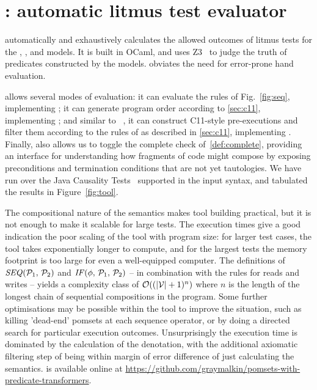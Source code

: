 \section{\PwTerTITLE: automatic litmus test evaluator}
\label{sec:tool}

\PwTer{} automatically and exhaustively calculates the allowed outcomes of litmus tests for the \PwT, \PwTpo, and \PwTc{} models. It is built in OCaml, and uses Z3~\cite{Z3Solver} to judge the truth of predicates constructed by the models. \PwTer{} obviates the need for error-prone hand evaluation.

\PwTer{} allows several modes of evaluation: it can evaluate the rules of Fig.~\ref{fig:seq}, implementing \PwT; it can generate program order according to \textsection\ref{sec:c11}, implementing \PwTpo; and similar to \MRD~\cite{DBLP:conf/esop/PaviottiCPWOB20}, it can construct C11-style pre-executions and filter them according to the rules of \rcXI{} as described in \textsection\ref{sec:c11}, implementing \PwTc{}.
Finally, \PwTer{} also allows us to toggle the complete check of~\ref{def:complete}, providing an interface for understanding how fragments of code might compose by exposing preconditions and termination conditions that are not yet tautologies.
We have run \PwTer{} over the Java Causality Tests~\cite{PughWebsite} supported in the input syntax, and tabulated the results in Figure~\ref{fig:tool}.

The compositional nature of the semantics makes tool building practical, but it is not enough to make it scalable for large tests.
The execution times give a good indication the poor scaling of the tool with program size: for larger test cases, the tool takes exponentially longer to compute, and for the largest tests the memory footprint is too large for even a well-equipped computer.
The definitions of $\sSEMI{\aPSS_1}{\aPSS_2}$ and $\sIF{\aForm}\sTHEN\aPSS_1\sELSE\aPSS_2\sFI$ -- in combination with the rules for reads and writes -- yields a complexity class of $\mathcal{O}((|\mathcal{V}| + 1)^{n})$ where $n$ is the length of the longest chain of sequential compositions in the program.
Some further optimisations may be possible within the tool to improve the situation, such as killing 'dead-end' pomsets at each sequence operator, or by doing a directed search for particular execution outcomes.
Unsurprisingly the execution time is dominated by the calculation of the denotation, with the additional axiomatic filtering step of \PwTc{} being within margin of error difference of just calculating the \PwT{} semantics. 
\PwTer{} is available online at \url{https://github.com/graymalkin/pomsets-with-predicate-transformers}.

